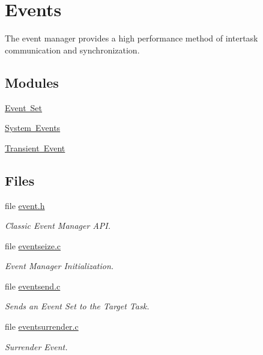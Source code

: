 \hypertarget{group__ClassicEvent}{}\section{Events}
\label{group__ClassicEvent}


The event manager provides a high performance method of intertask communication and synchronization.  


\subsection*{Modules}
\begin{DoxyCompactItemize}
\item 
\mbox{\hyperlink{group__ClassicEventSet}{Event Set}}
\item 
\mbox{\hyperlink{group__ClassicEventSystem}{System Events}}
\item 
\mbox{\hyperlink{group__ClassicEventTransient}{Transient Event}}
\end{DoxyCompactItemize}
\subsection*{Files}
\begin{DoxyCompactItemize}
\item 
file \mbox{\hyperlink{rtems_2rtems_2event_8h}{event.\+h}}
\begin{DoxyCompactList}\small\item\em Classic Event Manager A\+PI. \end{DoxyCompactList}\item 
file \mbox{\hyperlink{eventseize_8c}{eventseize.\+c}}
\begin{DoxyCompactList}\small\item\em Event Manager Initialization. \end{DoxyCompactList}\item 
file \mbox{\hyperlink{eventsend_8c}{eventsend.\+c}}
\begin{DoxyCompactList}\small\item\em Sends an Event Set to the Target Task. \end{DoxyCompactList}\item 
file \mbox{\hyperlink{eventsurrender_8c}{eventsurrender.\+c}}
\begin{DoxyCompactList}\small\item\em Surrender Event. \end{DoxyCompactList}\end{DoxyCompactItemize}
